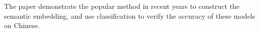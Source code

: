 \begin{abstractEN}

  The  paper demonstrate the popular method in recent years to construct the semantic embedding, and use classification to verify the accuracy of these models on Chinese.  

\end{abstractEN}

